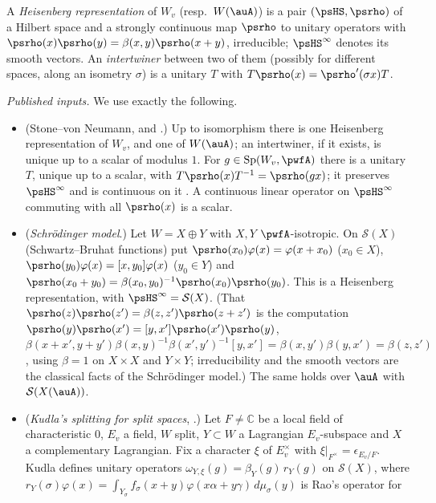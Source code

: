 \documentclass[10pt]{amsart}
\theoremstyle{definition}
\theoremstyle{remark}
\newcommand{\C}{\mathbb C}
\providecommand{\auS}{\mathcal S}
\begin{document}
A \emph{Heisenberg representation} of $W_v$ (resp.\ $W(\auA)$) is a pair $(\psHS,\psrho)$ of a
Hilbert space and a strongly continuous map $\psrho$ to unitary operators with
$\psrho(x)\psrho(y)=\beta(x,y)\psrho(x+y)$, irreducible; $\psHS^\infty$ denotes its smooth vectors.
An \emph{intertwiner} between two of them (possibly for different spaces, along an isometry
$\sigma$) is a unitary $T$ with $T\psrho(x)=\psrho'(\sigma x)T$.

\emph{Published inputs.} We use exactly the following.
\begin{itemize}
\item[(P1)] (Stone--von Neumann, and \cite[Th\'eor\`eme~1 and no.~34]{WeilActa}.) Up to
isomorphism there is one Heisenberg representation of $W_v$, and one of $W(\auA)$; an
intertwiner, if it exists, is unique up to a scalar of modulus $1$. For $g\in\mathrm{Sp}(W_v,\pwfA)$
there is a unitary $T$, unique up to a scalar, with $T\psrho(x)T^{-1}=\psrho(gx)$; it preserves
$\psHS^\infty$ and is continuous on it \cite[no.~35]{WeilActa}. A continuous linear operator on
$\psHS^\infty$ commuting with all $\psrho(x)$ is a scalar.
\item[(P2)] (\emph{Schr\"odinger model}.) Let $W=X\oplus Y$ with $X,Y$ $\pwfA$-isotropic. On
$\auS(X)$ (Schwartz--Bruhat functions) put $\psrho(x_0)\varphi(x)=\varphi(x+x_0)$ ($x_0\in X$),
$\psrho(y_0)\varphi(x)=[x,y_0]\varphi(x)$ ($y_0\in Y$) and $\psrho(x_0+y_0)=\beta(x_0,y_0)^{-1}
\psrho(x_0)\psrho(y_0)$. This is a Heisenberg representation, with $\psHS^\infty=\auS(X)$. (That
$\psrho(z)\psrho(z')=\beta(z,z')\psrho(z+z')$ is the computation $\psrho(y)\psrho(x')=[y,x']
\psrho(x')\psrho(y)$, $\beta(x+x',y+y')\beta(x,y)^{-1}\beta(x',y')^{-1}[y,x']=\beta(x,y')\beta(y,x')
=\beta(z,z')$, using $\beta=1$ on $X\times X$ and $Y\times Y$; irreducibility and the smooth
vectors are the classical facts of the Schr\"odinger model.) The same holds over $\auA$ with
$\auS(X(\auA))$.
\item[(P3)] (\emph{Kudla's splitting for split spaces}, \cite[Theorem~3.1, p.~378; (1.11)--(1.13),
p.~370; (1.14), p.~371; \S5, pp.~399--400]{KudlaSplitting}.) Let $F\ne\C$ be a local field of characteristic $0$, $E_v$ a field,
$W$ split, $Y\subset W$ a Lagrangian $E_v$-subspace and $X$ a complementary Lagrangian. Fix a
character $\xi$ of $E_v^\times$ with $\xi|_{F^\times}=\epsilon_{E_v/F}$. Kudla defines unitary
operators $\omega_{Y,\xi}(g)=\beta_{Y}(g)\,r_Y(g)$ on $\auS(X)$, where $r_Y(\sigma)\varphi(x)=
\int_{Y_\sigma}f_\sigma(x+y)\varphi(x\alpha+y\gamma)\,d\mu_\sigma(y)$ is Rao's operator for

\end{itemize}
\end{document}

